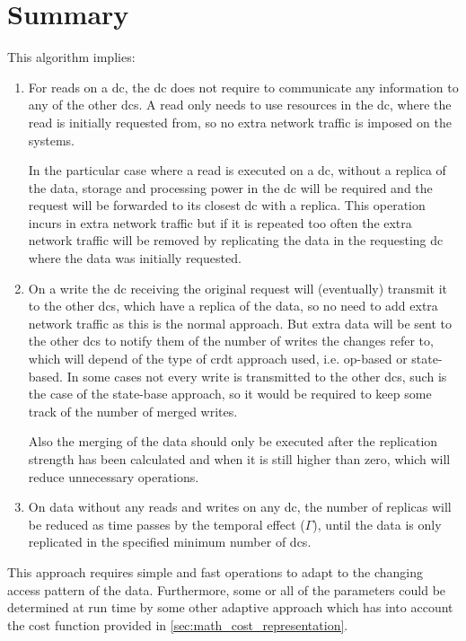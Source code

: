 \documentclass{acm_proc_article-sp}
\begin{document}
\section{Summary}
This algorithm implies:
\begin{enumerate}
	\item For reads on a \gls{dc}, the \gls{dc} does not require to communicate any information to any of the other \glspl{dc}. A read only needs to use resources in the \gls{dc}, where the read is initially requested from, so no extra network traffic is imposed on the systems.
	
	In the particular case where a read is executed on a \gls{dc}, without a replica of the data, storage and processing power in the \gls{dc} will be required and the request will be forwarded to its closest \gls{dc} with a replica. This operation incurs in extra network traffic but if it is repeated too often the extra network traffic will be removed by replicating the data in the requesting \gls{dc} where the data was initially requested.
	
	\item On a write the \gls{dc} receiving the original request will (eventually) transmit it to the other \glspl{dc}, which have a replica of the data, so no need to add extra network traffic as this is the normal approach. But extra data will be sent to the other \glspl{dc} to notify them of the number of writes the changes refer to, which will depend of the type of \gls{crdt} approach used, i.e. op-based or state-based. In some cases not every write is transmitted to the other \glspl{dc}, such is the case of the state-base approach, so it would be required to keep some track of the number of merged writes.
	
	Also the merging of the data should only be executed after the replication strength has been calculated and when it is still higher than zero, which will reduce unnecessary operations.

	\item On data without any reads and writes on any \gls{dc}, the number of replicas will be reduced as time passes by the temporal effect ($\Gamma$), until the data is only replicated in the specified minimum number of \glspl{dc}.
\end{enumerate}

This approach requires simple and fast operations to adapt to the changing access pattern of the data. Furthermore, some or all of the parameters could be determined at run time by some other adaptive approach which has into account the cost function provided in \ref{sec:math_cost_representation}.
\end{document}
